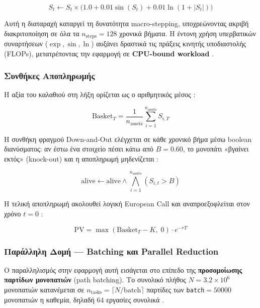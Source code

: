 \begin{equation}
  S_t \leftarrow S_t \times
    \bigl(1.0 + 0.01\sin(S_t) + 0.01\ln(1 + |S_t|)\bigr)
\end{equation}

Αυτή η διαταραχή καταργεί τη δυνατότητα macro-stepping, υποχρεώνοντας ακριβή διακριτοποίηση σε όλα τα $n_\mathrm{steps}=128$ χρονικά βήματα. Η έντονη χρήση υπερβατικών συναρτήσεων ($\exp, \sin, \ln$) αυξάνει δραστικά τις πράξεις κινητής υποδιαστολής (FLOPs), μετατρέποντας την εφαρμογή σε \textbf{CPU-bound workload} \cite{appcode}.

\subsubsection{Συνθήκες Αποπληρωμής}

Η αξία του καλαθιού στη λήξη ορίζεται ως ο αριθμητικός μέσος \cite{appcode}:

\begin{equation}
  \mathrm{Basket}_T = \frac{1}{n_\mathrm{assets}}\sum_{i=1}^{n_\mathrm{assets}} S_{i,T}
\end{equation}

Η συνθήκη φραγμού Down-and-Out ελέγχεται σε κάθε χρονικό βήμα μέσω boolean διανύσματος: αν έστω ένα στοιχείο πέσει κάτω από $B=0.60$, το μονοπάτι «βγαίνει εκτός» (knock-out) και η αποπληρωμή μηδενίζεται \cite{AtlantisMC,appcode}:

\begin{equation}
  \mathrm{alive} \leftarrow \mathrm{alive}
    \wedge \bigwedge_{i=1}^{n_\mathrm{assets}} (S_{i,t} > B)
\end{equation}

Η τελική αποπληρωμή ακολουθεί λογική European Call και αναπροεξοφλείται στον χρόνο $t=0$ \cite{AtlantisMC}:

\begin{equation}
  \mathrm{PV} = \max(\mathrm{Basket}_T - K,\; 0) \cdot e^{-rT}
\end{equation}

\subsubsection{Παράλληλη Δομή — Batching και Parallel Reduction}

Ο παραλληλισμός στην εφαρμογή αυτή εισάγεται στο επίπεδο της \textbf{προσομοίωσης παρτίδων μονοπατιών} (path batching). Το συνολικό πλήθος $N = 3.2 \times 10^6$ μονοπατιών κατανέμεται σε $n_\mathrm{tasks} = \lceil N / \mathrm{batch} \rceil$ παρτίδες των \texttt{batch}$=50000$ μονοπατιών η καθεμία, δηλαδή $64$ εργασίες συνολικά \cite{appcode}.

